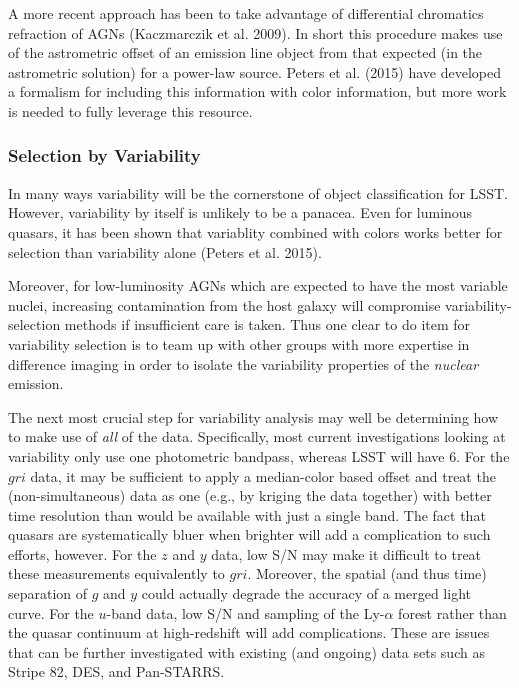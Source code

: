 A more recent approach has been to take advantage of differential
chromatics refraction of AGNs (Kaczmarczik et al. 2009).  In short
this procedure makes use of the astrometric offset of an emission line
object from that expected (in the astrometric solution) for a
power-law source.  Peters et al. (2015) have developed a formalism for
including this information with color information, but more work is
needed to fully leverage this resource.

\subsubsection{Selection by Variability}

In many ways variability will be the cornerstone of object
classification for LSST.  However, variability by itself is unlikely
to be a panacea.  Even for luminous quasars, it has been shown that
variablity combined with colors works better for selection than
variability alone (Peters et al. 2015).  

Moreover, for low-luminosity AGNs which are expected to have the most
variable nuclei, increasing contamination from the host galaxy will
compromise variability-selection methods if insufficient care is
taken.  Thus one clear to do item for variability selection is to team
up with other groups with more expertise in difference imaging in
order to isolate the variability properties of the {\em nuclear}
emission.

The next most crucial step for variability analysis may well be
determining how to make use of {\em all} of the data.  Specifically,
most current investigations looking at variability only use one
photometric bandpass, whereas LSST will have 6.  For the $gri$ data,
it may be sufficient to apply a median-color based offset and treat
the (non-simultaneous) data as one (e.g., by kriging the data
together) with better time resolution than would be available with
just a single band.  The fact that quasars are systematically bluer
when brighter will add a complication to such efforts, however.  For
the $z$ and $y$ data, low S/N may make it difficult to treat these
measurements equivalently to $gri$.  Moreover, the spatial (and thus
time) separation of $g$ and $y$ could actually degrade the accuracy of
a merged light curve.  For the $u$-band data, low S/N and sampling of
the Ly-$\alpha$ forest rather than the quasar continuum at
high-redshift will add complications.  These are issues that can be
further investigated with existing (and ongoing) data sets such as
Stripe 82, DES, and Pan-STARRS.

